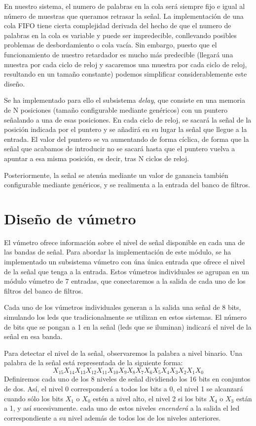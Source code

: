 \documentclass[a4paper,12pt]{article}
\begin{document}
En nuestro sistema, el numero de palabras en la cola será siempre fijo e igual al número de muestras que queramos retrasar la señal. La implementación de una cola FIFO tiene cierta complejidad derivada del hecho de que el numero de palabras en la cola es variable y puede ser impredecible, conllevando posibles problemas de desbordamiento o cola vacía. Sin embargo, puesto que el funcionamiento de nuestro retardador es mucho más predecible (llegará una muestra por cada ciclo de reloj y sacaremos una muestra por cada ciclo de reloj, resultando en un tamaño constante) podemos simplificar considerablemente este diseño.

Se ha implementado para ello el subsistema \emph{delay}, que consiste en una memoria de N posiciones (tamaño configurable mediante genéricos) con un puntero señalando a una de esas posiciones. En cada ciclo de reloj, se sacará la señal de la posición indicada por el puntero y se añadirá en su lugar la señal que llegue a la entrada. El valor del puntero se va aumentando de forma cíclica, de forma que la señal que acabamos de introducir no se sacará hasta que el puntero vuelva a apuntar a esa misma posición, es decir, tras N ciclos de reloj.

Posteriormente, la señal se atenúa mediante un valor de ganancia también configurable mediante genéricos, y se realimenta a la entrada del banco de filtros.
\section{Diseño de vúmetro}
El vúmetro ofrece información sobre el nivel de señal disponible en cada una de las bandas de señal. Para abordar la implementación de este módulo, se ha implementado un subsistema vúmetro con úna única entrada que ofrece el nivel de la señal que tenga a la entrada. Estos vúmetros individuales se agrupan en un módulo vúmetro de 7 entradas, que conectaremos a la salida de cada uno de los filtros del banco de filtros.

Cada uno de los vúmetros individuales generan a la salida una señal de 8 bits, simulando los leds que tradicionalmente se utilizan en estos sistemas. El número de bits que se pongan a 1 en la señal (leds que se iluminan) indicará el nivel de la señal en esa banda.

Para detectar el nivel de la señal, observaremos la palabra a nivel binario. Una palabra de la señal está representada de la siguiente forma:
$$X_{15} X_{14} X_{13} X_{12} X_{11} X_{10} X_{9} X_{8} X_{7} X_{6} X_{5} X_{4} X_{3} X_{2} X_{1} X_{0}$$
Definiremos cada uno de los 8 niveles de señal dividiendo los 16 bits en conjuntos de dos. Así, el nivel 0 corresponderá a todos los bits a 0, el nivel 1 se alcanzará cuando sólo los bits $X_1$ o $X_0$ estén a nivel alto, el nivel 2 si los bits $X_4$ o $X_3$ están a 1, y así sucesivamente. cada uno de estos niveles \emph{encenderá} a la salida el led correspondiente a su nivel además de todos los de los niveles anteriores.
\end{document}
